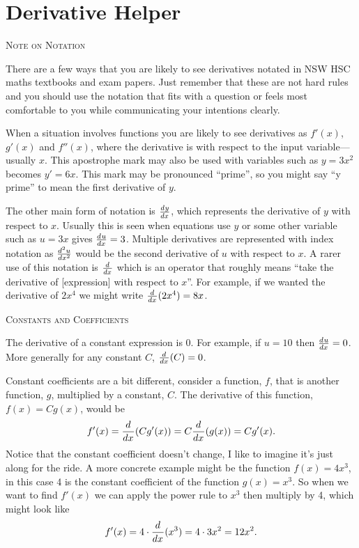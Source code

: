 \documentclass[a4paper,10pt]{article}
\newcommand{\deriv}[3][ ]{\ensuremath\frac{d^{#1}#2}{d#3^{#1}}}
\newcommand{\derivof}[2][ ]{\ensuremath\frac{d^{#1}}{d#2^{#1}}}
\begin{document}
\section*{Derivative Helper}

\begin{multicols*}{2}

{\large\textsc{Note on Notation}}

There are a few ways that you are likely to see derivatives notated in NSW HSC maths 
textbooks and exam papers. Just remember that these are not hard rules and you should 
use the notation that fits with a question or feels most comfortable to you while 
communicating your intentions clearly.

When a situation involves functions you are likely to see derivatives as 
$f'(x)$, $g'(x)$ and $f''(x)$, where the derivative is with respect to the input 
variable---usually $x$. This apostrophe mark may also be used with variables 
such as $y = 3x^2$ becomes $y' = 6x$. This mark may be pronounced ``prime'', 
so you might say ``y prime'' to mean the first derivative of $y$.

The other main form of notation is $\deriv{y}{x}$, which represents the derivative 
of $y$ with respect to $x$. Usually this is seen when equations use $y$ or some 
other variable such as $u = 3x$ gives $\deriv{u}{x} = 3$. Multiple derivatives are 
represented with index notation as $\deriv[2]{u}{x}$ would be the second derivative of 
$u$ with respect to $x$. A rarer use of this notation is $\derivof{x}$ which is an 
operator that roughly means ``take the derivative of [expression] with respect to $x$''.
For example, if we wanted the derivative of $2x^4$ we might write $\derivof{x}(2x^4) = 8x$.

{\large\rule{0em}{1.5em}\textsc{Constants and Coefficients}}

The derivative of a constant expression is 0. For example, if $u = 10$ then 
$\deriv{u}{x} = 0$. More generally for any constant $C$, $\derivof{x}(C) = 0$.

Constant coefficients are a bit different, consider a function, $f$, that is 
another function, $g$, multiplied by a constant, $C$. The derivative of 
this function, $f(x) = Cg(x)$, would be 
$$f'(x) = \derivof{x}(Cg'(x)) = C\derivof{x}(g(x)) = Cg'(x).$$
Notice that the constant coefficient doesn't change, I like to imagine it's 
just along for the ride. A more concrete example might be the function 
$f(x) = 4x^3$, in this case 4 is the constant coefficient of the function 
$g(x) = x^3$. So when we want to find $f'(x)$ we can apply the power 
rule to $x^3$ then multiply by 4, which might look like 
$$f'(x) = 4 \cdot \derivof{x}(x^3) = 4\cdot 3x^2 = 12x^2.$$


\end{multicols*}
\end{document}
